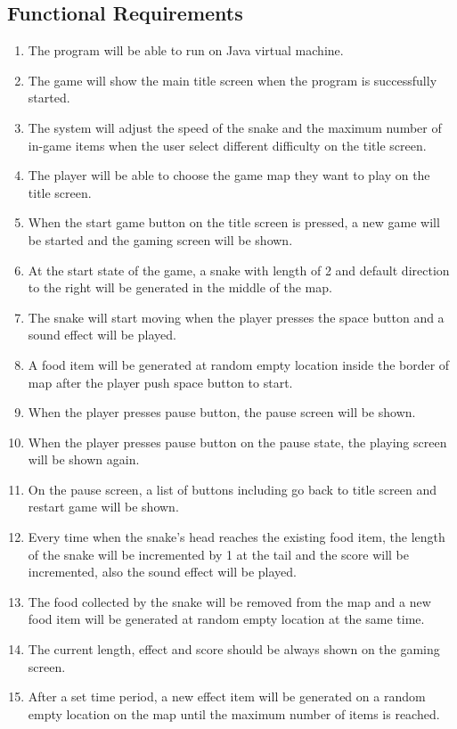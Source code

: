 \documentclass[12pt, titlepage]{article}
\begin{document}
\subsection{Functional Requirements}
\begin{enumerate}[{FR}1.]
    \item The program will be able to run on Java virtual machine.
    \item The game will show the main title screen when the program is successfully started.
    \item The system will adjust the speed of the snake and the maximum number of in-game items when the user select different difficulty on the title screen.
    \item The player will be able to choose the game map they want to play on the title screen.
    \item When the start game button on the title screen is pressed, a new game will be started and the gaming screen will be shown.
    \item At the start state of the game, a snake with length of 2 and default direction to the right will be generated in the middle of the map.
    \item The snake will start moving when the player presses the space button and a sound effect will be played.
    \item A food item will be generated at random empty location inside the border of map after the player push space button to start.
    \item When the player presses pause button, the pause screen will be shown.
    \item When the player presses pause button on the pause state, the playing screen will be shown again.
    \item On the pause screen, a list of buttons including go back to title screen and restart game will be shown.
    \item Every time when the snake's head reaches the existing food item, the length of the snake will be incremented by 1 at the tail and the score will be incremented, also the sound effect will be played.
    \item The food collected by the snake will be removed from the map and a new food item will be generated at random empty location at the same time.
    \item The current length, effect and score should be always shown on the gaming screen.
    \item After a set time period, a new effect item will be generated on a random empty location on the map until the maximum number of items is reached.

\end{enumerate}
\end{document}
